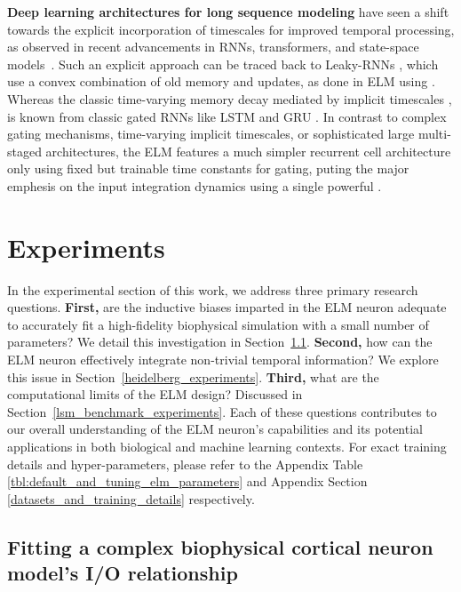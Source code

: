 \documentclass{article} \usepackage{iclr2024_doc_style,times}
\begin{document}
\textbf{Deep learning architectures for long sequence modeling} have seen a shift towards the explicit incorporation of timescales for improved temporal processing, as observed in recent advancements in RNNs, transformers, and state-space models~\cite{guefficiently, mahto2021multitimescale, smith2023simplified, ma2023mega}. Such an explicit approach can be traced back to Leaky-RNNs \cite{mozer1991induction,jaeger2002tutorial,kusupati2018fastgrnn,tallec2018can}, which use a convex combination of old memory and updates, as done in ELM using . Whereas the classic time-varying memory decay mediated by implicit timescales \cite{tallec2018can}, is known from classic gated RNNs like LSTM \cite{hochreiter1997long} and GRU \cite{cho2014learning}. In contrast to complex gating mechanisms, time-varying implicit timescales, or sophisticated large multi-staged architectures, the ELM features a much simpler recurrent cell architecture only using fixed but trainable time constants  for gating, puting the major emphesis on the input integration dynamics using a single powerful .



\vspace{-3pt} \section{Experiments}
\label{experiments}
\vspace{-3pt}

In the experimental section of this work, we address three primary research questions. \textbf{First,} are the inductive biases imparted in the ELM neuron adequate to accurately fit a high-fidelity biophysical simulation with a small number of parameters? We detail this investigation in Section~\ref{neuronio_experiments}. \textbf{Second,} how can the ELM neuron effectively integrate non-trivial temporal information? We explore this issue in Section~\ref{heidelberg_experiments}. \textbf{Third,} what are the computational limits of the ELM design? Discussed in Section~\ref{lsm_benchmark_experiments}. Each of these questions contributes to our overall understanding of the ELM neuron's capabilities and its potential applications in both biological and machine learning contexts. For exact training details and hyper-parameters, please refer to the Appendix Table \ref{tbl:default_and_tuning_elm_parameters} and Appendix Section \ref{datasets_and_training_details} respectively. 

\subsection{Fitting a complex biophysical cortical neuron model's I/O relationship}
\label{neuronio_experiments}
\end{document}
